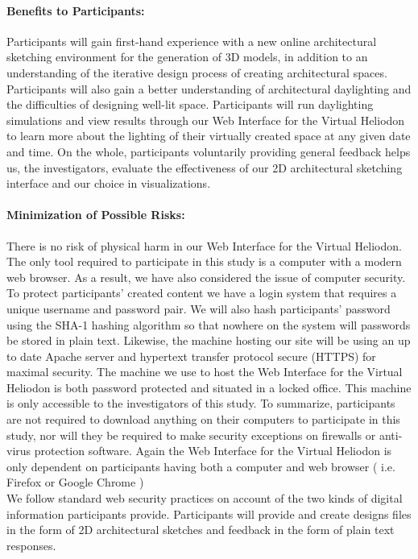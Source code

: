 \documentclass[12pt]{article}
\begin{document}
\paragraph{Benefits to Participants:}
%
Participants will gain first-hand experience with a new online architectural sketching environment for the generation of 3D models, in addition to an understanding of the iterative design process of creating architectural spaces. 
Participants will also gain a better understanding of architectural daylighting and the difficulties of designing well-lit space.
Participants will run daylighting simulations and view results through our Web Interface for the Virtual Heliodon to learn more about the lighting of their virtually created space at any given date and time.
On the whole, participants voluntarily providing general feedback helps us, the investigators, evaluate the effectiveness of our 2D architectural sketching interface and our choice in visualizations.

\paragraph{Minimization of Possible Risks:}   
% 
There is no risk of physical harm in our Web Interface for the Virtual Heliodon.
The only tool required to participate in this study is a computer with a modern web browser.
As a result, we have also considered the issue of computer security. 
To protect participants' created content we have a login system that requires a unique username and password pair.
We will also hash participants' password using the SHA-1 hashing algorithm so that nowhere on the system will passwords be stored in plain text.
Likewise, the machine hosting our site will be using an up to date Apache server and hypertext transfer protocol secure (HTTPS) for maximal security. 
The machine we use to host the Web Interface for the Virtual Heliodon is both password protected and situated in a locked office.
This machine is only accessible to the investigators of this study.
To summarize, participants are not required to download anything on their computers to participate in this study, nor will they be required to make security exceptions on firewalls or anti-virus protection software.
Again the Web Interface for the Virtual Heliodon is only dependent on participants having both a computer and web browser ( i.e. Firefox or Google Chrome )\\

We follow standard web security practices on account of the two kinds of digital information participants provide.
Participants will provide and create designs files in the form of 2D architectural sketches and feedback in the form of plain text responses.\\
\end{document}
